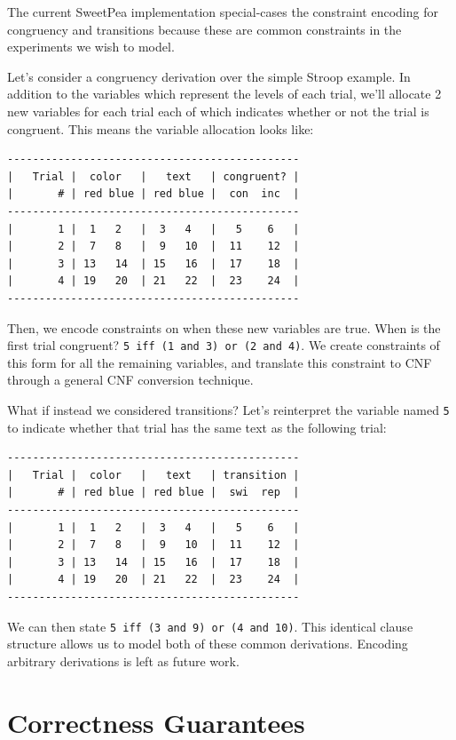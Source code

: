 The current SweetPea implementation special-cases the constraint encoding for congruency and transitions because these are common constraints in the experiments we wish to model.

Let's consider a congruency derivation over the simple Stroop example. In addition to the variables which represent the levels of each trial, we'll allocate 2 new variables for each trial each of which indicates whether or not the trial is congruent. This means the variable allocation looks like:

\begin{verbatim}
----------------------------------------------
|   Trial |  color   |   text   | congruent? |
|       # | red blue | red blue |  con  inc  |
----------------------------------------------
|       1 |  1   2   |  3   4   |   5    6   |
|       2 |  7   8   |  9   10  |  11    12  |
|       3 | 13   14  | 15   16  |  17    18  |
|       4 | 19   20  | 21   22  |  23    24  |
----------------------------------------------
\end{verbatim}

Then, we encode constraints on when these new variables are true. When is the first trial congruent? \texttt{5 iff (1 and 3) or (2 and 4)}. We create constraints of this form for all the remaining variables, and translate this constraint to CNF through a general CNF conversion technique.

What if instead we considered transitions? Let's reinterpret the variable named \texttt{5} to indicate whether that trial has the same text as the following trial:

\begin{verbatim}
----------------------------------------------
|   Trial |  color   |   text   | transition |
|       # | red blue | red blue |  swi  rep  |
----------------------------------------------
|       1 |  1   2   |  3   4   |   5    6   |
|       2 |  7   8   |  9   10  |  11    12  |
|       3 | 13   14  | 15   16  |  17    18  |
|       4 | 19   20  | 21   22  |  23    24  |
----------------------------------------------
\end{verbatim}

We can then state \texttt{5 iff (3 and 9) or (4 and 10)}. This identical clause structure allows us to model both of these common derivations. Encoding arbitrary derivations is left as future work.

\section{Correctness Guarantees}

